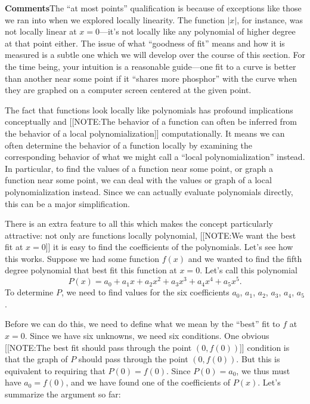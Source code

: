 \begin{center}
\end{center}



{\bf Comments}\quad The ``at most points'' qualification is because of
exceptions like those we ran into when we explored locally linearity.
The function $|x|$, for instance, was not locally linear at
$x=0$---it's not locally like any polynomial of higher degree at that
point either.  The issue of what ``goodness of fit'' means and how it
is measured is a subtle one which we will develop over the course of
this section.  For the time being, your intuition is a reasonable
guide---one fit to a curve is better than another near some point if
it ``shares more phosphor'' with the curve when they are graphed on a
computer screen centered at the given point.

The fact that functions look locally like polynomials has profound
implications conceptually and
[[NOTE:The behavior of a function can often be inferred from the
  behavior of a local polynomialization]]
computationally.  It means we can often determine the behavior of a
function locally by examining the corresponding behavior of what we
might call a ``local polynomialization'' instead.  In particular, to
find the values of a function near some point, or graph a function
near some point, we can deal with the values or graph of a local
polynomialization instead.  Since we can actually evaluate polynomials
directly, this can be a major simplification.

There is an extra feature to all this which makes the concept
particularly attractive: not only are functions locally polynomial, 
[[NOTE:We want the  best fit at $x=0$]]
it
is easy to find the coefficients of the polynomials.  Let's see how
this works.  Suppose we had some function $f(x)$ and we wanted to find
the fifth degree polynomial that best fit this function at $x=0$.
Let's call this polynomial
\[
P(x) = a_0+a_1x+a_2x^2+a_3x^3+a_4x^4+a_5x^5.
\]
To determine $P$, we need to find values for the six coefficients
$a_0$, $a_1$, $a_2$, $a_3$, $a_4$, $a_5$.

Before we can do this, we need to define what we mean by the ``best''
fit to $f$ at $x=0$.  Since we have six unknowns, we need six
conditions.  One obvious 
[[NOTE:The best fit should pass through the point $(0, f(0))$]]
condition is that the graph of $P$ should pass through the point $(0,
f(0))$.  But this is equivalent to requiring that $P(0)=f(0)$.  Since
$P(0)=a_0$, we thus must have $a_0=f(0)$, and we have found one of the
coefficients of $P(x)$.  Let's summarize the argument so far:


